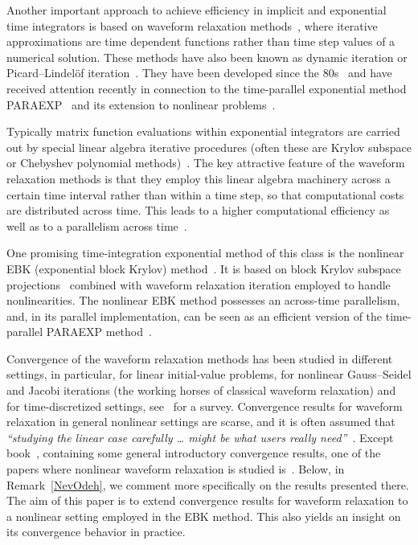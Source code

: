 \documentclass[sn-aps]{sn-jnl}
\theoremstyle{thmstyleone}%
\theoremstyle{thmstyletwo}%
\theoremstyle{thmstylethree}%
\begin{document}
Another important approach to achieve efficiency in implicit and exponential
time integrators is based on waveform relaxation methods~\cite{Lelarasmee_ea1982,NewtonSangiovanni1983,Vandewalle1993corrected},
where iterative approximations are time dependent functions
rather than time step values of a numerical solution.
These methods have also been known as dynamic iteration or
Picard--Lindel\"of iteration~\cite{MiekkalaNevanlinna1996}.
They have been developed since the 
80s~\cite{NewtonSangiovanni1983,White_ea1985,MiekkalaNevanlinna1987,LubO87,JanssenVandewalle1996}
and have received attention
recently in connection to the time-parallel exponential method PARAEXP~\cite{PARAEXP} 
and its extension to nonlinear problems~\cite{Kooij_ea2017,Kooij_ea2018}.

Typically matrix function evaluations within exponential integrators are
carried out by special linear algebra iterative procedures (often these are
Krylov subspace or Chebyshev polynomial 
methods)~\cite{ParkLight86,Henk:f(A),DruskinKnizh89,TalEzer89,GallSaad92,DruskinKnizh95,HochLub97}.
The key attractive feature of the waveform relaxation methods is that
they employ this linear algebra machinery across a certain time interval
rather than within a time step, so that computational costs are distributed
across time.  This leads to a higher computational efficiency
as well as to a parallelism across time~\cite{Vandewalle1993corrected}.

One promising time-integration exponential method of this class is
the nonlinear EBK (exponential block Krylov) method~\cite{Kooij_ea2017,Kooij_ea2018}.
It is based on block Krylov subspace projections~\cite{Botchev2013} combined with
waveform relaxation iteration employed to handle nonlinearities.
The nonlinear EBK method possesses an across-time parallelism,
and, in its parallel implementation, can be seen as an efficient version
of the time-parallel PARAEXP method~\cite{Kooij_ea2017,Kooij_ea2018}.

Convergence of the waveform relaxation methods has been studied
in different settings, in particular, for linear initial-value problems,
for nonlinear Gauss--Seidel and Jacobi iterations (the working horses of
classical waveform relaxation) and
for time-discretized settings, see~\cite{MiekkalaNevanlinna1996,Vandewalle1993corrected} for a survey.
Convergence results for waveform relaxation in general nonlinear settings
are scarse, and it is often assumed that
\emph{``studying the linear case carefully \dots{}
might be what users really need''}~\cite{MiekkalaNevanlinna1996}.
Except book~\cite{Vandewalle1993corrected}, containing some
general introductory convergence results, 
one of the papers where nonlinear waveform relaxation is
studied is~\cite{NevanlinnaOdeh1987}.  Below, in Remark~\ref{NevOdeh}, 
we comment more specifically on the results presented there.
The aim of this paper is to extend convergence results for waveform relaxation 
to a nonlinear setting employed in the EBK method.
This also yields an insight on its convergence behavior in practice.
\end{document}
